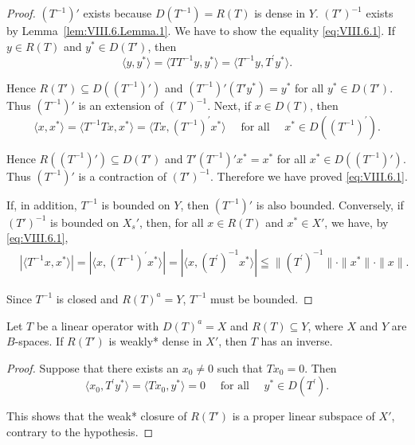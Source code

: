 \begin{proof}
 $(T^{-1})'$ exists because $D(T^{-1}) = R(T)$ is dense in $Y$. $(T')^{-1}$ exists by Lemma~\ref{lem:VIII.6.Lemma.1}. We have to show the equality \eqref{eq:VIII.6.1}. If $y \in R(T)$ and $y^* \in D(T')$, then 
\[
\langle y, y ^{*} \rangle = \langle T T ^{-1} y, y ^{*} \rangle = \langle T ^{-1} y, T ^{\prime} y ^{*} \rangle . \]

Hence $R(T') \subseteq D((T^{-1})')$ and $(T^{-1})'(T'y^*) = y^*$ for all $y^* \in D(T')$. Thus $(T^{-1})'$ is an extension of $(T')^{-1}$. Next, if $x \in D(T)$, then 
\[
\langle x, x ^{*} \rangle = \langle T ^{-1} T x, x ^{*} \rangle = \langle T x, (T ^{-1}) ^{\prime} x ^{*} \rangle \quad \text{ for all } \quad x ^{*} \in D ((T ^{-1}) ^{\prime}).
\]

Hence $R((T^{-1})') \subseteq D(T')$ and $T'(T^{-1})' x^* = x^*$ for all $x^* \in D((T^{-1})')$. Thus $(T^{-1})'$ is a contraction of $(T')^{-1}$. Therefore we have proved \eqref{eq:VIII.6.1}. 

If, in addition, $T^{-1}$ is bounded on $Y$, then $(T^{-1})'$ is also bounded. Conversely, if $(T')^{-1}$ is bounded on $X_s'$, then, for all $x \in R(T)$ and $x^* \in X'$, we have, by \eqref{eq:VIII.6.1}, 
\[
\begin{aligned}
&| \langle T ^{-1} x, x ^{*} \rangle |  = | \langle x, (T ^{-1}) ^{\prime} x ^{*} \rangle | = | \langle x, (T ^{\prime}) ^{-1} x ^{*} \rangle | \leqq \| (T ^{\prime}) ^{-1} \| \cdot \| x ^{*} \| \cdot \| x \|.
\end{aligned}
\]

Since $T^{-1}$ is closed and $R(T)^{a} = Y$, $T^{-1}$ must be bounded. 
\end{proof}
\begin{lemma}\label{lem:VIII.6.Lemma.2} Let $T$ be a linear operator with $D(T)^a = X$ and $R(T) \subseteq Y$, where $X$ and $Y$ are $B$-spaces. If $R(T')$ is weakly* dense in $X'$, then $T$ has an inverse. 
\end{lemma}

\begin{proof}
 Suppose that there exists an $x_{0} \neq 0$ such that $Tx_{0} = 0$. Then 
\[
\langle x _{0}, T ^{\prime} y ^{*} \rangle = \langle T x _{0}, y ^{*} \rangle = 0 \quad \text{ for all } \quad y ^{*} \in D (T ^{\prime}). \]

This shows that the weak* closure of $R(T')$ is a proper linear subspace of $X'$, contrary to the hypothesis. 
\end{proof}

